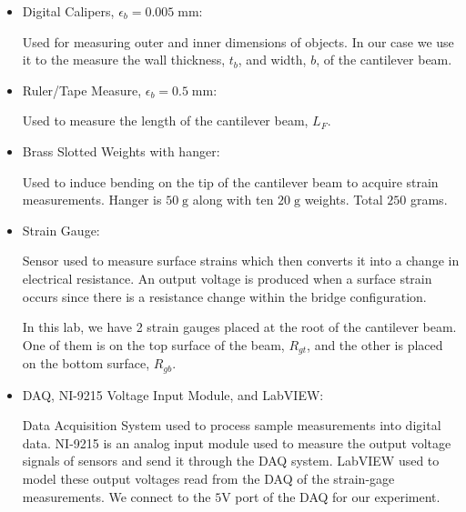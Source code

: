 \documentclass{article}
\begin{document}
\begin{itemize}
\item Digital Calipers, $\epsilon_{b} = 0.005\; \text{mm}$: 
\vspace{1mm}

Used for measuring outer and inner dimensions of objects. In our case we use it to the measure the wall thickness, $t_{b}$, and width, $b$, of the cantilever beam.
\vspace{2.5mm}

\item Ruler/Tape Measure, $\epsilon_{b} = 0.5\; \text{mm}$: 
\vspace{1mm}

Used to measure the length of the cantilever beam, $L_{F}$.
\vspace{2.5mm}

\item Brass Slotted Weights with hanger: 
\vspace{1mm}

Used to induce bending on the tip of the cantilever beam to acquire strain measurements. Hanger is $50\; \text{g}$ along with ten $20\; \text{g}$ weights. Total $250$ grams. 
\vspace{2.5mm}

\item Strain Gauge: 
\vspace{1mm}

Sensor used to measure surface strains which then converts it into a change in electrical resistance. An output voltage is produced when a surface strain occurs since there is a resistance change within the bridge configuration.
\vspace{1mm}

In this lab, we have 2 strain gauges placed at the root of the cantilever beam. One of them is on the top surface of the beam, $R_{g t}$, and the other is placed on the bottom surface, $R_{g b}$.
\vspace{2.5mm}

\item DAQ, NI-9215 Voltage Input Module, and LabVIEW:
\vspace{1mm}

Data Acquisition System used to process sample measurements into digital data. NI-9215 is an analog input module used to measure the output voltage signals of sensors and send it through the DAQ system. LabVIEW used to model these output voltages read from the DAQ of the strain-gage measurements. We connect to the $5 \text{V}$ port of the DAQ for our experiment.
\vspace{2.5mm}


\end{itemize}
\end{document}

